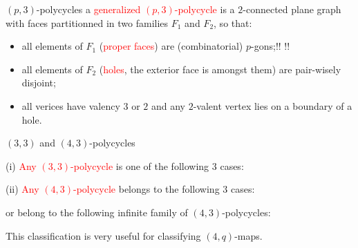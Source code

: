 \documentclass[%
pdf,
colorBG,
slideColor,
]{prosper}
\begin{document}

\begin{slide}{$(p,3)$-polycycles}
a \textcolor{red}{generalized $(p,3)$-polycycle} is a 
$2$-connected plane graph with faces partitionned
in two families $F_1$ and $F_2$, so that:
\begin{itemize}
\item all elements of $F_1$ (\textcolor{red}{proper faces}) are
(combinatorial) $p$-gons;!! 
!!%
\item all elements of $F_2$ (\textcolor{red}{holes}, the exterior face
is amongst them) are pair-wisely disjoint;
\item all verices have valency $3$ or $2$ and any $2$-valent vertex lies on a 
boundary of a hole.
\end{itemize}

\begin{center}
\end{center}

\end{slide}







\begin{slide}{$(3,3)$ and $(4,3)$-polycycles}
{\it\scriptsize


(i) \textcolor{red}{Any $(3,3)$-polycycle} is one of the following $3$ cases:
\begin{center}
\end{center}

(ii) \textcolor{red}{Any $(4,3)$-polycycle} belongs to the following $3$ cases:
\begin{center}
\end{center}
\hspace{1cm}or belong to the following infinite family of $(4,3)$-polycycles:
\begin{center}
\end{center}

}
This classification is very useful for classifying $(4,q)$-maps.

\end{slide}
\end{document}
